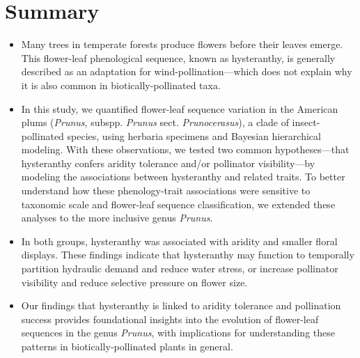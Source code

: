 \documentclass{article}[12pt]
\begin{document}
\section*{Summary} %
\begin{itemize}
\item Many trees in temperate forests produce flowers before their leaves emerge. This flower-leaf phenological sequence, known as hysteranthy, is generally described as an adaptation for wind-pollination---which does not explain why it is also common in biotically-pollinated taxa. 

\item In this study, we quantified flower-leaf sequence variation in the American plums (\emph{Prunus}, subspp. \emph{Prunus} sect. \emph{Prunocerasus}), a clade of insect-pollinated species, using herbaria specimens and Bayesian hierarchical modeling. With these observations, we tested two common hypotheses---that hysteranthy confers aridity tolerance and/or pollinator visibility---by modeling the associations between hysteranthy and related traits. To better understand how these phenology-trait associations were sensitive to taxonomic scale and flower-leaf sequence classification, we extended these analyses to the more inclusive genus \emph{Prunus}. 

\item In both groups, hysteranthy was associated with aridity and smaller floral displays. These findings indicate that hysteranthy may function to temporally partition hydraulic demand and reduce water stress, or increase pollinator visibility and reduce selective pressure on flower size.

\item %
Our findings that hysteranthy is linked to aridity tolerance and pollination success
provides foundational insights into the evolution of flower-leaf sequences in the genus \emph{Prunus}, with implications for understanding these patterns in biotically-pollinated plants in general.
\end{itemize}
\end{document}
